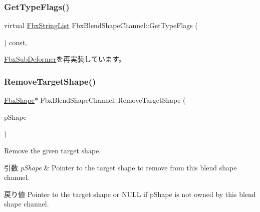\subsubsection{\texorpdfstring{Get\+Type\+Flags()}{GetTypeFlags()}}
{\footnotesize\ttfamily virtual \hyperlink{class_fbx_string_list}{Fbx\+String\+List} Fbx\+Blend\+Shape\+Channel\+::\+Get\+Type\+Flags (\begin{DoxyParamCaption}{ }\end{DoxyParamCaption}) const\hspace{0.3cm}{\ttfamily [protected]}, {\ttfamily [virtual]}}



\hyperlink{class_fbx_sub_deformer_a80652fd0521b2ea1897e221e5ae1b5cf}{Fbx\+Sub\+Deformer}を再実装しています。

\mbox{\label{class_fbx_blend_shape_channel_a13265acf6f671cf6ec1228105831ff15}} 
\subsubsection{\texorpdfstring{Remove\+Target\+Shape()}{RemoveTargetShape()}}
{\footnotesize\ttfamily \hyperlink{class_fbx_shape}{Fbx\+Shape}$\ast$ Fbx\+Blend\+Shape\+Channel\+::\+Remove\+Target\+Shape (\begin{DoxyParamCaption}\item[{\hyperlink{class_fbx_shape}{Fbx\+Shape} $\ast$}]{p\+Shape }\end{DoxyParamCaption})}

Remove the given target shape. 
\begin{DoxyParams}{引数}
{\em p\+Shape} & Pointer to the target shape to remove from this blend shape channel. \\
\hline
\end{DoxyParams}
\begin{DoxyReturn}{戻り値}
Pointer to the target shape or {\ttfamily N\+U\+LL} if p\+Shape is not owned by this blend shape channel. 
\end{DoxyReturn}
\mbox{\label{class_fbx_blend_shape_channel_a3b633999bdf324fe9ac96e297c572eba}} 
